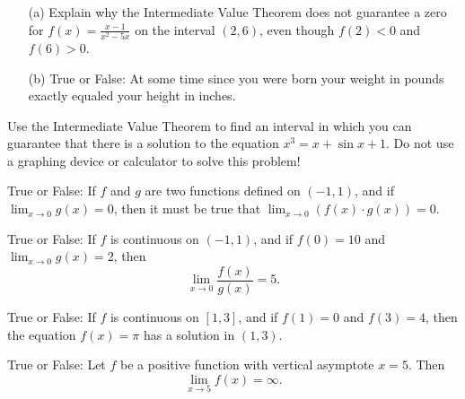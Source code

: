 \documentclass[handout,nooutcomes]{ximera}
\begin{document}
\newpage

\begin{problem}
  \label{problem:application-of-ivt}
  \mbox{}
  \begin{itemize}
    \item[(a)]
      Explain why the Intermediate Value Theorem does not guarantee a zero for $f(x) = \frac{x-1}{x^2 - 5x}$ on the interval $(2,6)$, even though $f(2) < 0$ and $f(6) > 0$.

    \item[(b)]
      True or False: At some time since you were born your weight in pounds exactly equaled your height in inches.
  \end{itemize}
\end{problem}

\begin{problem}
  \label{problem:finding-a-root}
  Use the Intermediate Value Theorem to find an interval in which you can guarantee that there is a solution to the equation $x^3 = x + \sin x + 1$.
  Do not use a graphing device or calculator to solve this problem!
\end{problem}

\begin{problem}
  \label{problem:can-we-apply-limit-laws}
  True or False: If $f$ and $g$ are two functions defined on $(-1, 1)$, and if $\displaystyle \lim_{x \to 0} g(x) = 0$, then it must be true that $\displaystyle \lim_{x \to 0} (f(x) \cdot g(x)) = 0$.
\end{problem}

\begin{problem}
  \label{problem:cont-and-limit-laws}
  True or False: If $f$ is continuous on $(-1, 1)$, and if $f(0) = 10$ and $\displaystyle \lim_{x \to 0} g(x) = 2$, then
  \[
    \lim_{x \to 0} \frac{f(x)}{g(x)} = 5.
  \]
\end{problem}

\begin{problem}
  \label{problem:cont-and-limit-laws}
  True or False: If $f$ is continuous on $[1, 3]$, and if $f(1) = 0$ and $f(3) = 4$, then the equation $f(x) = \pi$ has a solution in $(1, 3)$.
\end{problem}

\begin{problem}
  \label{problem:vertical-asymptote}
  True or False: Let $f$ be a positive function with vertical asymptote $x = 5$. Then
  \[
    \lim_{x \to 5} f(x) = \infty.
  \]
\end{problem}
\end{document}
